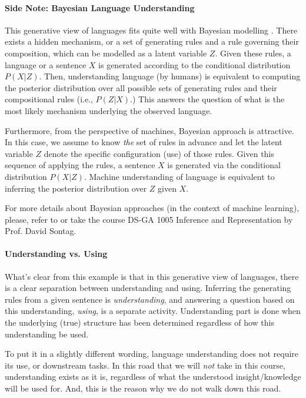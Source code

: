\documentclass{report}
\begin{document}
\paragraph{Side Note: Bayesian Language Understanding} This generative view of
languages fits quite well with Bayesian modelling
\citep[see, e.g.,][]{perfors2006poverty}. There exists a hidden mechanism, or a set of
generating rules and a rule governing their composition, which can be modelled
as a latent variable $Z$.  Given these rules, a language or a sentence $X$ is
generated according to the conditional distribution $P(X|Z)$. Then,
understanding language (by humans) is equivalent to computing the posterior
distribution over all possible sets of generating rules and their compositional
rules (i.e., $P(Z|X)$.) This answers the question of what is the most likely
mechanism underlying the observed language.

Furthermore, from the perspective of machines, Bayesian approach is attractive.
In this case, we assume to know \emph{the} set of rules in advance and let the
latent variable $Z$ denote the specific configuration (use) of those rules.
Given this sequence of applying the rules, a sentence $X$ is generated via the
conditional distribution $P(X|Z)$. Machine understanding of language is
equivalent to inferring the posterior distribution over $Z$ given $X$.

For more details about Bayesian approaches (in the context of machine learning),
please, refer to \citet{bishop2006pattern} or take the course DS-GA 1005
Inference and Representation by Prof. David Sontag.

\paragraph{Understanding vs. Using} 
What's clear from this example is that in this generative view of languages,
there is a clear separation between understanding and using. Inferring the
generating rules from a given sentence is \emph{understanding}, and answering a
question based on this understanding, \emph{using}, is a separate activity.
Understanding part is done when the underlying (true) structure has been
determined regardless of how this understanding be used.

To put it in a slightly different wording, language understanding does not
require its use, or downstream tasks. In this road that we will {\em not} take
in this course, understanding exists as it is, regardless of what the understood
insight/knowledge will be used for. And, this is the reason why we do not walk
down this road.
\end{document}
